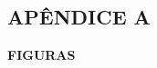\clearpage
\vspace*{\fill}
\begin{center}
    \section*{APÊNDICE A}
    \textbf{FIGURAS}
\end{center}
\vspace*{\fill}
\clearpage
\newpage



\newpage

\newpage


